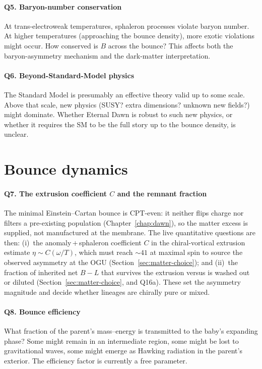 \paragraph{Q5. Baryon-number conservation}
At trans-electroweak temperatures, sphaleron processes violate baryon number. At
higher temperatures (approaching the bounce density), more exotic violations might occur.
How conserved is $B$ across the bounce? This affects both the baryon-asymmetry
mechanism and the dark-matter interpretation.

\paragraph{Q6. Beyond-Standard-Model physics}
The Standard Model is presumably an effective theory valid up to some scale.
Above that scale, new physics (SUSY? extra dimensions? unknown new fields?) might
dominate. Whether Eternal Dawn is robust to such new physics, or whether it requires the
SM to be the full story up to the bounce density, is unclear.

\section{Bounce dynamics}

\paragraph{Q7. The extrusion coefficient $C$ and the remnant fraction}
The minimal Einstein--Cartan bounce is CPT-even: it neither flips charge nor
filters a pre-existing population (Chapter~\ref{chap:dawn}), so the matter excess
is supplied, not manufactured at the membrane. The live quantitative questions
are then: (i)~the anomaly\,$+$\,sphaleron coefficient $C$ in the
chiral-vortical extrusion estimate $\eta\sim C(\omega/T)$, which must reach
$\sim41$ at maximal spin to source the observed asymmetry at the OGU
(Section~\ref{sec:matter-choice}); and (ii)~the fraction of inherited net $B{-}L$
that survives the extrusion versus is washed out or diluted
(Section~\ref{sec:matter-choice}, and Q16a). These set the asymmetry magnitude and decide
whether lineages are chirally pure or mixed.

\paragraph{Q8. Bounce efficiency}
What fraction of the parent's mass--energy is transmitted to the baby's expanding
phase? Some might remain in an intermediate region, some might be lost to
gravitational waves, some might emerge as Hawking radiation in the parent's
exterior. The efficiency factor is currently a free parameter.

